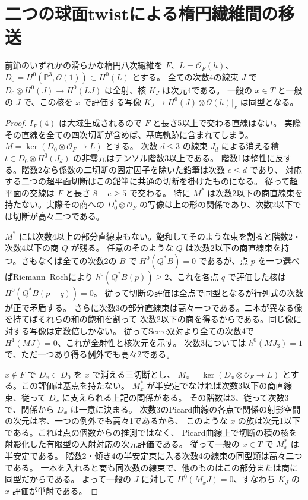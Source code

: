 \section{二つの球面twistによる楕円繊維間の移送}
\label{sec:finite-elliptic-fiber-transfer}
\begin{lemma}\label{lem:octic-linear-determinant}
前節のいずれかの滑らかな楕円八次繊維を $F$、$L=\mathcal O_F(h)$、
$D_0=H^0(\mathbb P^3,\mathcal O(1))\subset H^0(L)$ とする。
全ての次数4の線束 $J$ で $D_0\otimes H^0(J)\to H^0(LJ)$ は全射、核 $K_J$ は次元4である。
一般の $x\in T$ と一般の $J$ で、この核を $x$ で評価する写像
$K_J\to H^0(J)\otimes\mathcal O(h)|_x$ は同型となる。
\end{lemma}
\begin{proof}
$I_F(4)$ は大域生成されるので $F$ と長さ5以上で交わる直線はない。
実際その直線を全ての四次切断が含めば、基底軌跡に含まれてしまう。
$M=\ker(D_0\otimes\mathcal O_F\to L)$ とする。
次数 $d\le3$ の線束 $J_d$ による消える積
$t\in D_0\otimes H^0(J_d)$ の非零元はテンソル階数3以上である。
階数1は整性に反する。階数2なら係数の二切断の固定因子を除いた鉛筆は次数 $e\le d$ であり、
対応する二つの超平面切断はこの鉛筆に共通の切断を掛けたものになる。
従って超平面の交線は $F$ と長さ $8-e\ge5$ で交わる。
特に $M^*$ は次数2以下の商直線束を持たない。実際その商への
$D_0^*\otimes\mathcal O_F$ の写像は上の形の関係であり、次数2以下では切断が高々二つである。

$M^*$ には次数4以上の部分直線束もない。飽和してそのような束を割ると階数2・次数4以下の商 $Q$ が残る。
任意のそのような $Q$ は次数2以下の商直線束を持つ。さもなくば全ての次数2の $B$ で
$H^0(Q^* B)=0$ であるが、点 $p$ を一つ選べばRiemann--Rochにより
$h^0(Q^*B(p))\ge2$、これを各点 $q$ で評価した核は $H^0(Q^*B(p-q))=0$。
従って切断の評価は全点で同型となるが行列式の次数が正で矛盾する。
さらに次数3の部分直線束は高々一つである。二本が異なる像を持てばそれらの和の飽和を割って
次数2以下の商を得るからである。同じ像に対する写像は定数倍しかない。
従ってSerre双対より全ての次数4で $H^1(MJ)=0$、これが全射性と核次元を示す。
次数3については $h^0(MJ_3)=1$ で、ただ一つあり得る例外でも高々2である。

$x\notin F$ で $D_x\subset D_0$ を $x$ で消える三切断とし、
$M_x=\ker(D_x\otimes\mathcal O_F\to L)$ とする。この評価は基点を持たない。
$M_x^*$ が半安定でなければ次数3以下の商直線束、従って $D_x$ に支えられる上記の関係がある。
その階数は3、従って次数3で、関係から $D_x$ は一意に決まる。
次数3のPicard曲線の各点で関係の射影空間の次元は零、一つの例外でも高々1であるから、
このような $x$ の族は次元1以下である。これは点の個数からの推測ではなく、
Picard曲線上で切断の積の核を射影化した有限型の入射対応の次元評価である。
従って一般の $x\in T$ で $M_x^*$ は半安定である。
階数2・傾き4の半安定束に入る次数4の線束の同型類は高々二つである。
一本を入れると商も同次数の線束で、他のものはこの部分または商に同型だからである。
よって一般の $J$ に対して $H^0(M_x J)=0$、すなわち $K_J$ の $x$ 評価が単射である。
\end{proof}

